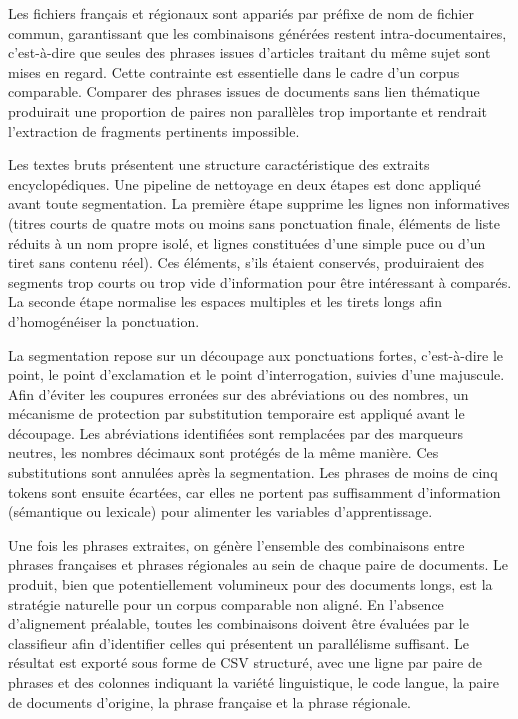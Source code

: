 Les fichiers français et régionaux sont appariés par préfixe de nom
de fichier commun, garantissant que les combinaisons générées restent intra-documentaires, c'est-à-dire
que seules des phrases issues d'articles traitant du même sujet sont mises en regard. Cette contrainte
est essentielle dans le cadre d'un corpus comparable. Comparer des phrases issues de documents sans
lien thématique produirait une proportion de paires non parallèles trop importante et rendrait l'extraction de
fragments pertinents impossible.

Les textes bruts présentent une structure caractéristique des extraits encyclopédiques.
Une pipeline de nettoyage en deux étapes est donc appliqué avant toute segmentation. La première étape
supprime les lignes non informatives (titres courts de quatre mots ou moins sans ponctuation finale,
éléments de liste réduits à un nom propre isolé, et lignes constituées d'une simple puce ou d'un
tiret sans contenu réel). Ces éléments, s'ils étaient conservés, produiraient des segments trop courts ou
trop vide d'information pour être intéressant à comparés. La seconde étape normalise les espaces multiples
et les tirets longs afin d'homogénéiser la ponctuation.

La segmentation repose sur un découpage aux ponctuations fortes, c'est-à-dire le point, le
point d'exclamation et le point d'interrogation, suivies d'une majuscule. Afin d'éviter les coupures
erronées sur des abréviations ou des nombres, un mécanisme de protection par
substitution temporaire est appliqué avant le découpage. Les abréviations identifiées sont remplacées
par des marqueurs neutres, les nombres décimaux sont protégés de la même manière. Ces substitutions
sont annulées après la segmentation. Les phrases de moins de cinq tokens sont ensuite écartées, car elles
ne portent pas suffisamment d'information (sémantique ou lexicale) pour alimenter les variables d'apprentissage.

Une fois les phrases extraites, on génère l'ensemble des combinaisons entre phrases
françaises et phrases régionales au sein de chaque paire de documents. Le produit, bien que
potentiellement volumineux pour des documents longs, est la stratégie naturelle pour un corpus comparable
non aligné. En l'absence d'alignement préalable, toutes les combinaisons doivent être évaluées par le
classifieur afin d'identifier celles qui présentent un parallélisme suffisant. Le résultat est
exporté sous forme de CSV structuré, avec une ligne par paire de phrases et des colonnes indiquant la
variété linguistique, le code langue, la paire de documents d'origine, la phrase française et la phrase
régionale.


